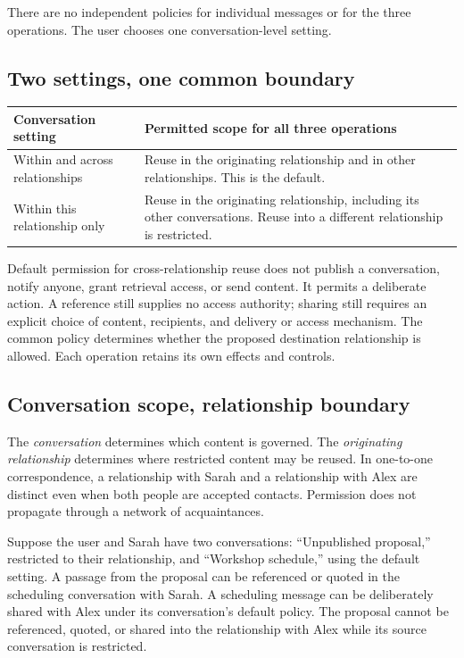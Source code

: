 \documentclass[11pt]{article}
\begin{document}
There are no independent policies for individual messages or for the three operations. The user chooses one conversation-level setting.

\subsection{Two settings, one common boundary}

\begin{center}
\begingroup
\small
\renewcommand{\arraystretch}{1.2}
\begin{tabularx}{\textwidth}{@{}p{}X@{}}
\toprule
\textbf{Conversation setting} & \textbf{Permitted scope for all three operations} \\
\midrule
Within and across relationships & Reuse in the originating relationship and in other relationships. This is the default. \\[0.5em]
Within this relationship only & Reuse in the originating relationship, including its other conversations. Reuse into a different relationship is restricted. \\
\bottomrule
\end{tabularx}
\endgroup
\end{center}

Default permission for cross-relationship reuse does not publish a conversation, notify anyone, grant retrieval access, or send content. It permits a deliberate action. A reference still supplies no access authority; sharing still requires an explicit choice of content, recipients, and delivery or access mechanism. The common policy determines whether the proposed destination relationship is allowed. Each operation retains its own effects and controls.

\subsection{Conversation scope, relationship boundary}

The \emph{conversation} determines which content is governed. The \emph{originating relationship} determines where restricted content may be reused. In one-to-one correspondence, a relationship with Sarah and a relationship with Alex are distinct even when both people are accepted contacts. Permission does not propagate through a network of acquaintances.

Suppose the user and Sarah have two conversations: ``Unpublished proposal,'' restricted to their relationship, and ``Workshop schedule,'' using the default setting. A passage from the proposal can be referenced or quoted in the scheduling conversation with Sarah. A scheduling message can be deliberately shared with Alex under its conversation's default policy. The proposal cannot be referenced, quoted, or shared into the relationship with Alex while its source conversation is restricted.
\end{document}

